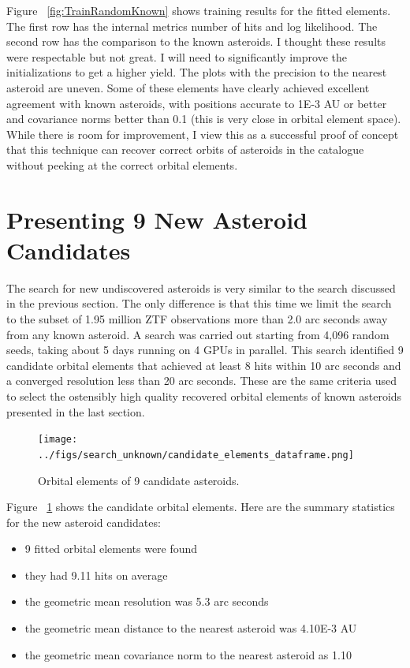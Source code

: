 Figure ~\ref{fig:TrainRandomKnown} shows training results for the fitted elements.
The first row has the internal metrics number of hits and log likelihood.
The second row has the comparison to the known asteroids.
I thought these results were respectable but not great.
I will need to significantly improve the initializations to get a higher yield.
The plots with the precision to the nearest asteroid are uneven.  
Some of these elements have clearly achieved excellent agreement with known asteroids, 
with positions accurate to 1E-3 AU or better and covariance norms better than 0.1 (this is very close in orbital element space).
While there is room for improvement, I view this as a successful proof of concept that this technique can recover correct orbits of asteroids 
in the catalogue without peeking at the correct orbital elements.

\section{Presenting 9 New Asteroid Candidates}
\label{section_results_unknown_ast}
The search for new undiscovered asteroids is very similar to the search discussed in the previous section.
The only difference is that this time we limit the search to the subset of 
1.95 million ZTF observations more than 2.0 arc seconds away from any known asteroid.
A search was carried out starting from 4,096 random seeds, taking about 5 days running on 4 GPUs in parallel.
This search identified 9 candidate orbital elements that achieved at least 8 hits within 10 arc seconds
and a converged resolution less than 20 arc seconds.
These are the same criteria used to select the ostensibly high quality recovered orbital elements of known asteroids presented in the last section.

\begin{figure}[h]
\begin{center}
\texttt{[image: ../figs/search\_unknown/candidate\_elements\_dataframe.png]}
\end{center}
\caption{Orbital elements of 9 candidate asteroids.}
\label{fig:CandidateOrbitalElements}
\end{figure}
Figure ~\ref{fig:CandidateOrbitalElements} shows the candidate orbital elements.
Here are the summary statistics for the new asteroid candidates:
\begin{itemize}
\item 9 fitted orbital elements were found
\item they had 9.11 hits on average
\item the geometric mean resolution was 5.3 arc seconds
\item the geometric mean distance to the nearest asteroid was 4.10E-3 AU
\item the geometric mean covariance norm to the nearest asteroid as 1.10
\end{itemize}

